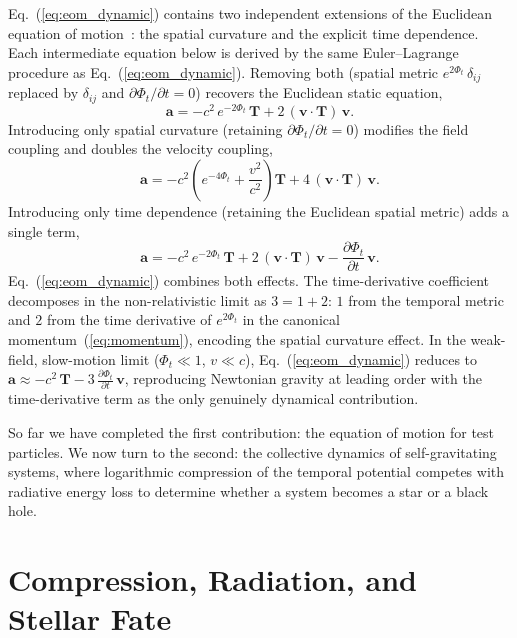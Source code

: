 \documentclass[12pt]{article}
\begin{document}
Eq.~(\ref{eq:eom_dynamic}) contains two independent extensions of the Euclidean equation of motion~\cite{Gwak2026a}: the spatial curvature and the explicit time dependence. Each intermediate equation below is derived by the same Euler--Lagrange procedure as Eq.~(\ref{eq:eom_dynamic}). Removing both (spatial metric $e^{2\Phi_t}\,\delta_{ij}$ replaced by $\delta_{ij}$ and $\partial\Phi_t/\partial t = 0$) recovers the Euclidean static equation,
$$
\mathbf{a} = -c^2\,e^{-2\Phi_t}\,\mathbf{T} + 2\,(\mathbf{v}\cdot\mathbf{T})\,\mathbf{v}.
\label{eq:eom_euclidean_static}
$$
Introducing only spatial curvature (retaining $\partial\Phi_t/\partial t = 0$) modifies the field coupling and doubles the velocity coupling,
$$
\mathbf{a} = -c^2\!\left(e^{-4\Phi_t} + \frac{v^2}{c^2}\right)\mathbf{T} + 4\,(\mathbf{v}\cdot\mathbf{T})\,\mathbf{v}.
\label{eq:eom_curved_static}
$$
Introducing only time dependence (retaining the Euclidean spatial metric) adds a single term,
$$
\mathbf{a} = -c^2\,e^{-2\Phi_t}\,\mathbf{T} + 2\,(\mathbf{v}\cdot\mathbf{T})\,\mathbf{v} - \frac{\partial\Phi_t}{\partial t}\,\mathbf{v}.
\label{eq:eom_euclidean_dynamic}
$$
Eq.~(\ref{eq:eom_dynamic}) combines both effects. The time-derivative coefficient decomposes in the non-relativistic limit as $3 = 1 + 2$: $1$ from the temporal metric and $2$ from the time derivative of $e^{2\Phi_t}$ in the canonical momentum~(\ref{eq:momentum}), encoding the spatial curvature effect. In the weak-field, slow-motion limit ($\Phi_t \ll 1$, $v \ll c$), Eq.~(\ref{eq:eom_dynamic}) reduces to $\mathbf{a} \approx -c^2\,\mathbf{T} - 3\,\frac{\partial\Phi_t}{\partial t}\,\mathbf{v}$, reproducing Newtonian gravity at leading order with the time-derivative term as the only genuinely dynamical contribution.

So far we have completed the first contribution: the equation of motion for test particles. We now turn to the second: the collective dynamics of self-gravitating systems, where logarithmic compression of the temporal potential competes with radiative energy loss to determine whether a system becomes a star or a black hole.


\section{Compression, Radiation, and Stellar Fate}
\label{sec:stellar_fate}
\end{document}
